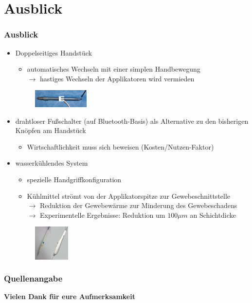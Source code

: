 \documentclass{beamer}
\begin{document}
\section{Ausblick}
\begin{frame}
\frametitle{Ausblick}
	\begin{itemize}
		\item Doppelseitiges Handstück \cite{dual}
		\begin{itemize}
			\item automatisches Wechseln mit einer simplen Handbewegung\\
			$\rightarrow$ hastiges Wechseln der Applikatoren wird vermieden		
		\end{itemize}
		\begin{figure}
			\includegraphics[width=2.8cm]{images/dual.png}
		\end{figure}
		\item drahtloser Fußschalter (auf Bluetooth-Basis) als Alternative zu den bisherigen Knöpfen am Handstück \cite{kramme2016medizintechnik}
		\begin{itemize}
			\item Wirtschaftlichkeit muss sich beweisen (Kosten/Nutzen-Faktor)
		\end{itemize}
		\item wasserkühlendes System \cite{waterCool}
		\begin{itemize}
			\item spezielle Handgriffkonfiguration
			\item Kühlmittel strömt von der Applikatorspitze zur Gewebeschnittstelle\\
			$\rightarrow$ Reduktion der Gewebewärme zur Minderung des Gewebeschadens\\
			$\rightarrow$ Experimentelle Ergebnisse: Reduktion um $100\mu m$ an Schichtdicke
		\end{itemize}
		\begin{figure}
			\includegraphics[width=1.8cm]{images/waterCool.png}
		\end{figure}
	\end{itemize}
\end{frame}


\begin{frame}[shrink]
\frametitle{Quellenangabe}
	
	
\end{frame}

\begin{frame}
\centering
\textbf{Vielen Dank für eure Aufmerksamkeit}
\end{frame}
\end{document}
